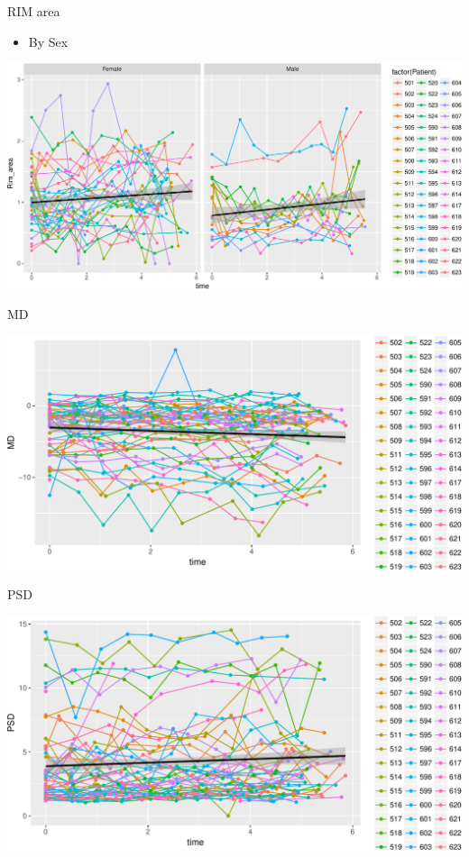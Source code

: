 \documentclass[ignorenonframetext,]{beamer}
\providecommand{\tightlist}{%
  \setlength{\itemsep}{0pt}\setlength{\parskip}{0pt}}
\begin{document}
\begin{frame}{RIM area}

\begin{itemize}
\tightlist
\item
  By Sex
\end{itemize}

\includegraphics{analisi_exp_markdown_files/figure-beamer/unnamed-chunk-13-1.pdf}

\end{frame}

\begin{frame}{MD}

\includegraphics{analisi_exp_markdown_files/figure-beamer/unnamed-chunk-14-1.pdf}

\end{frame}

\begin{frame}{PSD}

\includegraphics{analisi_exp_markdown_files/figure-beamer/unnamed-chunk-15-1.pdf}

\end{frame}
\end{document}
